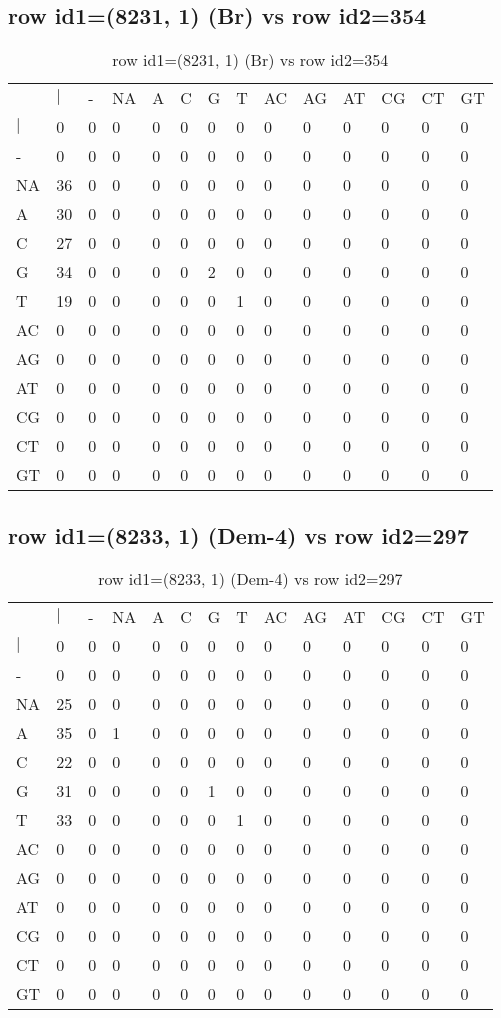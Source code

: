 \subsection{row id1=(8231, 1) (Br) vs row id2=354}
\begin{center}
\begin{longtable}{|l|l|l|l|l|l|l|l|l|l|l|l|l|l|}
\caption{row id1=(8231, 1) (Br) vs row id2=354} \label{table_dm160}\\
\hline
\\
\hline
&$|$&-&NA&A&C&G&T&AC&AG&AT&CG&CT&GT\\
$|$&0&0&0&0&0&0&0&0&0&0&0&0&0\\
-&0&0&0&0&0&0&0&0&0&0&0&0&0\\
NA&36&0&0&0&0&0&0&0&0&0&0&0&0\\
A&30&0&0&0&0&0&0&0&0&0&0&0&0\\
C&27&0&0&0&0&0&0&0&0&0&0&0&0\\
G&34&0&0&0&0&2&0&0&0&0&0&0&0\\
T&19&0&0&0&0&0&1&0&0&0&0&0&0\\
AC&0&0&0&0&0&0&0&0&0&0&0&0&0\\
AG&0&0&0&0&0&0&0&0&0&0&0&0&0\\
AT&0&0&0&0&0&0&0&0&0&0&0&0&0\\
CG&0&0&0&0&0&0&0&0&0&0&0&0&0\\
CT&0&0&0&0&0&0&0&0&0&0&0&0&0\\
GT&0&0&0&0&0&0&0&0&0&0&0&0&0\\
\hline
\end{longtable}
\end{center}

\subsection{row id1=(8233, 1) (Dem-4) vs row id2=297}
\begin{center}
\begin{longtable}{|l|l|l|l|l|l|l|l|l|l|l|l|l|l|}
\caption{row id1=(8233, 1) (Dem-4) vs row id2=297} \label{table_dm162}\\
\hline
\\
\hline
&$|$&-&NA&A&C&G&T&AC&AG&AT&CG&CT&GT\\
$|$&0&0&0&0&0&0&0&0&0&0&0&0&0\\
-&0&0&0&0&0&0&0&0&0&0&0&0&0\\
NA&25&0&0&0&0&0&0&0&0&0&0&0&0\\
A&35&0&1&0&0&0&0&0&0&0&0&0&0\\
C&22&0&0&0&0&0&0&0&0&0&0&0&0\\
G&31&0&0&0&0&1&0&0&0&0&0&0&0\\
T&33&0&0&0&0&0&1&0&0&0&0&0&0\\
AC&0&0&0&0&0&0&0&0&0&0&0&0&0\\
AG&0&0&0&0&0&0&0&0&0&0&0&0&0\\
AT&0&0&0&0&0&0&0&0&0&0&0&0&0\\
CG&0&0&0&0&0&0&0&0&0&0&0&0&0\\
CT&0&0&0&0&0&0&0&0&0&0&0&0&0\\
GT&0&0&0&0&0&0&0&0&0&0&0&0&0\\
\hline
\end{longtable}
\end{center}

